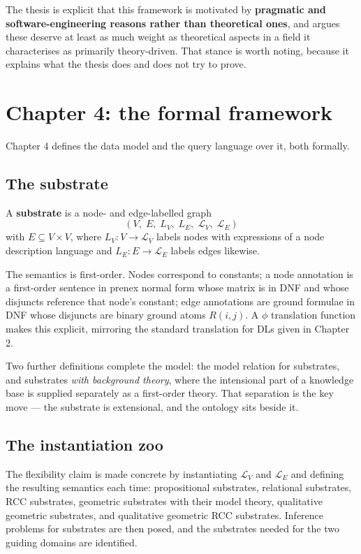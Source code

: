 \documentclass[11pt,a4paper,DIV=12,parskip=half]{scrartcl}
\newenvironment{note}
  {\begin{list}{}{\setlength{\leftmargin}{1.5em}\setlength{\rightmargin}{1.5em}%
                  \setlength{\listparindent}{0pt}}\item[]\small}
  {\end{list}}
\begin{document}
\begin{note}
The thesis is explicit that this framework is motivated by \textbf{pragmatic and
software-engineering reasons rather than theoretical ones}, and argues these
deserve at least as much weight as theoretical aspects in a field it
characterises as primarily theory-driven. That stance is worth noting, because
it explains what the thesis does and does not try to prove.
\end{note}

\section{Chapter 4: the formal framework}

Chapter 4 defines the data model and the query language over it, both formally.

\subsection{The substrate}

A \textbf{substrate} is a node- and edge-labelled graph
\[
  (V,\; E,\; L_V,\; L_E,\; \mathcal{L}_V,\; \mathcal{L}_E)
\]
with $E \subseteq V \times V$, where $L_V : V \rightarrow \mathcal{L}_V$ labels
nodes with expressions of a node description language and $L_E : E \rightarrow
\mathcal{L}_E$ labels edges likewise.

The semantics is first-order. Nodes correspond to constants; a node annotation is
a first-order sentence in prenex normal form whose matrix is in DNF and whose
disjuncts reference that node's constant; edge annotations are ground formulae
in DNF whose disjuncts are binary ground atoms $R(i,j)$. A $\phi$ translation
function makes this explicit, mirroring the standard translation for DLs given
in Chapter 2.

Two further definitions complete the model: the model relation for substrates,
and substrates \emph{with background theory}, where the intensional part of a
knowledge base is supplied separately as a first-order theory. That separation is
the key move --- the substrate is extensional, and the ontology sits beside it.

\subsection{The instantiation zoo}

The flexibility claim is made concrete by instantiating $\mathcal{L}_V$ and
$\mathcal{L}_E$ and defining the resulting semantics each time: propositional
substrates, relational substrates, RCC substrates, geometric substrates with
their model theory, qualitative geometric substrates, and qualitative geometric
RCC substrates. Inference problems for substrates are then posed, and the
substrates needed for the two guiding domains are identified.
\end{document}
